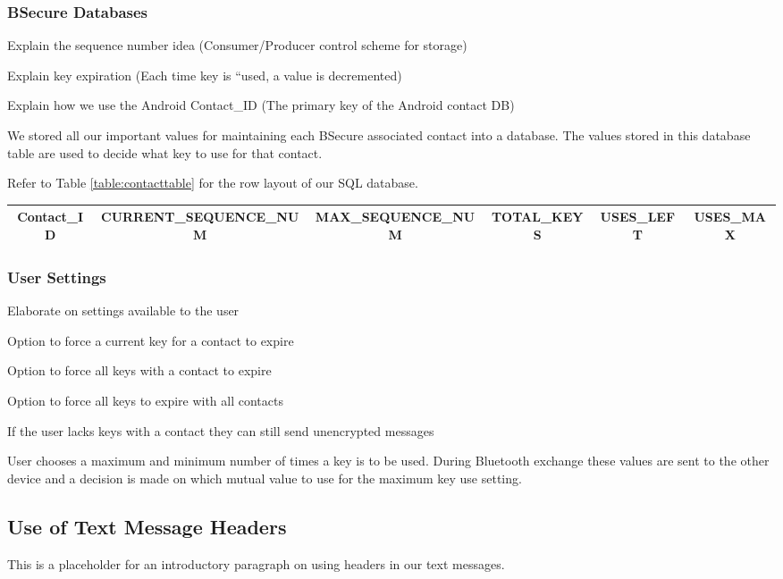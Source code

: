 \subsubsection{BSecure Databases}
Explain the sequence number idea (Consumer/Producer control scheme for storage)

Explain key expiration (Each time key is ``used, a value is decremented)

Explain how we use the Android Contact\_ID (The primary key of the Android contact DB)

We stored all our important values for maintaining each BSecure associated contact
into a database. The values stored in this database table are used to decide what key to use for that
contact.

Refer to Table \ref{table:contacttable} for the row layout of our SQL database.

\begin{table*}
\centering
\caption{Contact Table Design}
\label{table:contacttable}
\begin{tabular}{|c|c|c|c|c|c|} \hline
Contact\_ID&CURRENT\_SEQUENCE\_NUM&MAX\_SEQUENCE\_NUM&TOTAL\_KEYS&USES\_LEFT&USES\_MAX\\ \hline\end{tabular}
\end{table*}

\subsubsection{User Settings}
Elaborate on settings available to the user

Option to force a current key for a contact to expire

Option to force all keys with a contact to expire

Option to force all keys to expire with all contacts

If the user lacks keys with a contact they can still send unencrypted messages

User chooses a maximum and minimum number of times a key is to be used. During Bluetooth exchange
these values are sent to the other device and a decision is made on which mutual value to use for the maximum key use setting.

\subsection{Use of Text Message Headers}
This is a placeholder for an introductory paragraph on using headers in our text messages.

